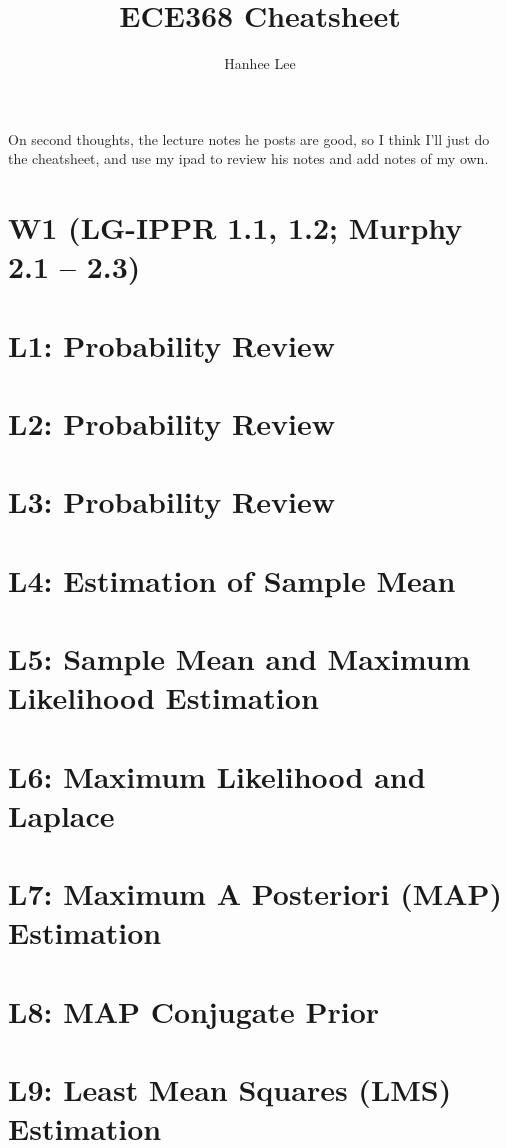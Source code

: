 \documentclass{article}
\title{ECE368 Cheatsheet}
\author{Hanhee Lee}
\begin{document}
\maketitle

\tableofcontents

\begin{summary}
    On second thoughts, the lecture notes he posts are good, so I think I'll just do the cheatsheet, and use my ipad to review his notes and add notes of my own.
\end{summary}
\section*{W1 (LG-IPPR 1.1, 1.2; Murphy 2.1 – 2.3)}
\section{L1: Probability Review}

\newpage

\section{L2: Probability Review}

\newpage

\section{L3: Probability Review}

\cleardoublepage

\section{L4: Estimation of Sample Mean}

\newpage

\section{L5: Sample Mean and Maximum Likelihood Estimation}

\newpage

\section{L6: Maximum Likelihood and Laplace}

\newpage

\section{L7: Maximum A Posteriori (MAP) Estimation} 

\newpage

\section{L8: MAP Conjugate Prior}
 
\newpage

\section{L9: Least Mean Squares (LMS) Estimation}
 
\newpage
\end{document}
